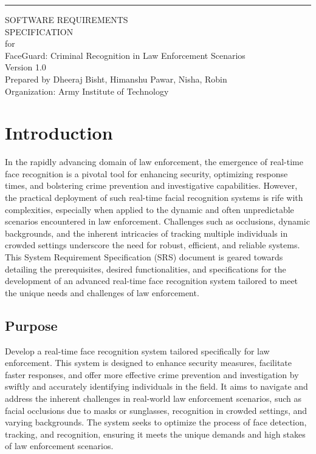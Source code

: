 \documentclass{scrreprt}
\date{}
\def\myversion{1.0 }
\begin{document}
\begin{flushright}
    \rule{14.4cm}{3pt}\vskip1cm
    \begin{bfseries}
        \Huge{SOFTWARE REQUIREMENTS\\ SPECIFICATION}\\
        \vspace{1.2cm}
        for\\
        \vspace{1.2cm}
        FaceGuard: Criminal Recognition in Law Enforcement Scenarios\\
        \vspace{1.2cm}
        \LARGE{Version \myversion}\\
        \vspace{1.2cm}
        Prepared by Dheeraj Bisht, Himanshu Pawar, Nisha, Robin\\
        \vspace{1.2cm}
        Organization: Army Institute of Technology\\
        \vspace{1.2cm}
    \end{bfseries}
\end{flushright}

\tableofcontents


\chapter{Introduction}
    In the rapidly advancing domain of law enforcement, the emergence of real-time face recognition is a pivotal tool for enhancing security, optimizing response times, and bolstering crime prevention and investigative capabilities. However, the practical deployment of such real-time facial recognition systems is rife with complexities, especially when applied to the dynamic and often unpredictable scenarios encountered in law enforcement. Challenges such as occlusions, dynamic backgrounds, and the inherent intricacies of tracking multiple individuals in crowded settings underscore the need for robust, efficient, and reliable systems. This System Requirement Specification (SRS) document is geared towards detailing the prerequisites, desired functionalities, and specifications for the development of an advanced real-time face recognition system tailored to meet the unique needs and challenges of law enforcement.
    
    \section{Purpose}
    Develop a real-time face recognition system tailored specifically for law enforcement. This system is designed to enhance security measures, facilitate faster responses, and offer more effective crime prevention and investigation by swiftly and accurately identifying individuals in the field. It aims to navigate and address the inherent challenges in real-world law enforcement scenarios, such as facial occlusions due to masks or sunglasses, recognition in crowded settings, and varying backgrounds. The system seeks to optimize the process of face detection, tracking, and recognition, ensuring it meets the unique demands and high stakes of law enforcement scenarios.
    
\end{document}
